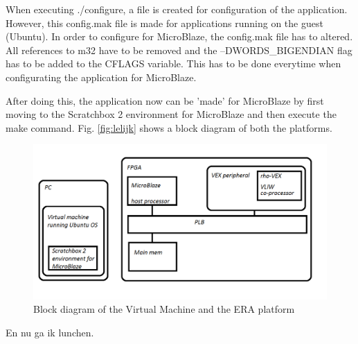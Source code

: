 When executing ./configure, a file is created for configuration of the application. However, this config.mak file is made for applications running on the guest (Ubuntu). In order to configure for MicroBlaze, the config.mak file has to altered. All references to m32 have to be removed and the --DWORDS\_BIGENDIAN flag has to be added to the CFLAGS variable. This has to be done everytime when configurating the application for MicroBlaze.

After doing this, the application now can be 'made' for MicroBlaze by first moving to the Scratchbox 2 environment for MicroBlaze and then execute the make command. Fig. \ref{fig:lelijk} shows a block diagram of both the platforms.

\begin{figure}[htb]%
\includegraphics[width=\columnwidth]{Pictures/Platform_paint}%
\caption{Block diagram of the Virtual Machine and the ERA platform}%
\label{lelijk}%
\end{figure}

En nu ga ik lunchen.